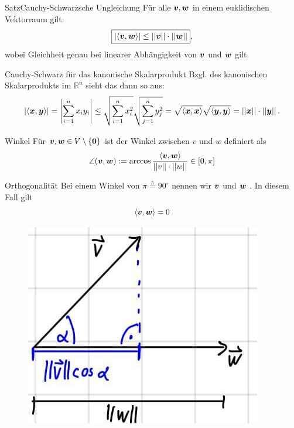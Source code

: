 \begin{Satz}
{Satz}{Cauchy-Schwarzsche Ungleichung}
Für alle $\vvec,\wvec$ in einem euklidischen Vektorraum gilt:
\begin{equation}
    \boxed{\Abs{\BiFo{\vvec,\wvec}}\leq\Norm{\vvec}\cdot\Norm{\wvec}},
\end{equation}
wobei Gleichheit genau bei linearer Abhängigkeit von $\vvec$ und $\wvec$ gilt.
\end{Satz}
\begin{Beispiel}
{Cauchy-Schwarz für das kanonische Skalarprodukt}
Bzgl. des kanonischen Skalarprodukts im $\mathbb{R}^n$ sieht das dann so aus:
\begin{equation*}
    \Abs{\BiFo{\xvec,\Vec{y}}}=\Abs{\sum_{i=1}^nx_iy_i}\leq\sqrt{\sum_{i=1}^nx_i^2}\sqrt{\sum_{j=1}^ny_j^2}=\sqrt{\BiFo{\xvec,\xvec}}\sqrt{\BiFo{\yvec,\yvec}}=\Norm{\xvec}\cdot \Norm{\yvec}.
\end{equation*}
\end{Beispiel}

\begin{Def}
{Winkel}
Für $\vvec,\wvec\in V\setminus\MengeDirekt{\Vec{0}}$ ist der Winkel zwischen $v$ und $w$ definiert als
\begin{equation}
    \angle(\vvec,\wvec):=\arccos\frac{\BiFo{\vvec,\wvec}}{\Norm{v}\cdot\Norm{w}}\in[0,\pi]
\end{equation}
\end{Def}
\begin{Def}
{Orthogonalität}
Bei einem Winkel von $\pi\overset{\wedge}{=}90^\circ$ nennen wir $\vvec$ und $\wvec$ . In diesem Fall gilt
\begin{equation}
    \BiFo{\vvec,\wvec}=0
\end{equation}
\end{Def}
\begin{figure}
 \vspace{-15pt}
\includegraphics[width=.15\textwidth]{Dateien/03/03CauchySchwarz.jpg}
 \vspace{-5pt}
\end{figure}


